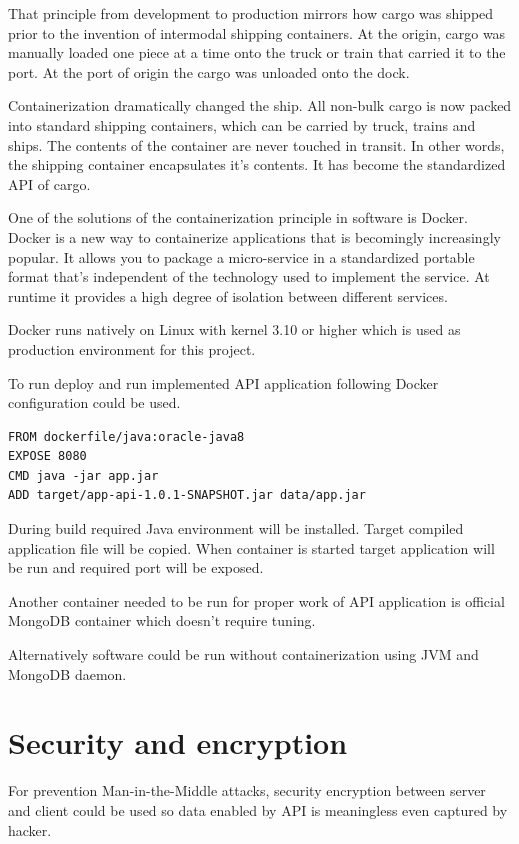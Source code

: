 \documentclass[thesis=M,english]{FITthesis}[2012/10/20]
\begin{document}
That principle from development to production mirrors how cargo was shipped prior to the invention of intermodal shipping containers. At the origin, cargo was manually loaded one piece at a time onto the truck or train that carried it to the port. At the port of origin the cargo was unloaded onto the dock.

Containerization dramatically changed the ship. All non-bulk cargo is now packed into standard shipping containers, which can be carried by truck, trains and ships. The contents of the container are never touched in transit. In other words, the shipping container encapsulates it’s contents. It has become the standardized API of cargo.

One of the solutions of the containerization principle in software is Docker. Docker is a new way to containerize applications that is becomingly increasingly popular. It allows you to package a micro-service in a standardized portable format that’s independent of the technology used to implement the service. At runtime it provides a high degree of isolation between different services.

Docker runs natively on Linux with kernel 3.10 or higher which is used as production environment for this project.

To run deploy and run implemented API application following Docker configuration could be used.

\begin{lstlisting}
FROM dockerfile/java:oracle-java8
EXPOSE 8080
CMD java -jar app.jar
ADD target/app-api-1.0.1-SNAPSHOT.jar data/app.jar
\end{lstlisting}

During build required Java environment will be installed. Target compiled application file will be copied. When container is started target application will be run and required port will be exposed.

Another container needed to be run for proper work of API application is official MongoDB container which doesn't require tuning.

Alternatively software could be run without containerization using JVM and MongoDB daemon.


\section{Security and encryption}

For prevention Man-in-the-Middle attacks, security encryption between server and client could be used so data enabled by API is meaningless even captured by hacker.
\end{document}
